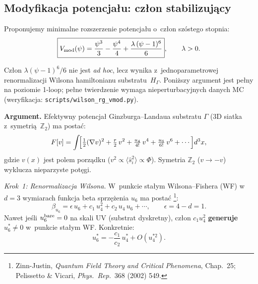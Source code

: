 \subsection{Modyfikacja potencjału: człon stabilizujący}%
\label{app:I-Vmod}

Proponujemy minimalne rozszerzenie potencjału o~człon szóstego stopnia:
\begin{equation}\label{eq:V-mod}
    \boxed{V_{\rm mod}(\psi)
    = \frac{\psi^3}{3} - \frac{\psi^4}{4}
    + \frac{\lambda\,(\psi-1)^6}{6}},
    \qquad \lambda > 0.
\end{equation}

\begin{proposition}%
\label{prop:V6-from-substrate}
Cz\l{}on $\lambda(\psi-1)^6/6$ nie jest \emph{ad hoc}, lecz wynika
z~jednoparametrowej renormalizacji Wilsona hamiltonianu
substratu~$H_\Gamma$.
Poni\.zszy argument jest pe\l{}ny na poziomie 1-loop;
pe\l{}ne twierdzenie wymaga nieperturbacyjnych danych MC
(weryfikacja: \texttt{scripts/wilson\_rg\_vmod.py}).

\medskip\noindent\textbf{Argument.}
Efektywny potencjał Ginzburga--Landaua substratu $\Gamma$
(3D siatka z~symetri\k{a}~$\mathbb{Z}_2$) ma postać:
\begin{equation}\label{eq:GL-substrate}
    F[v] = \int\!\Bigl[\tfrac{1}{2}(\nabla v)^2
    + \tfrac{r}{2}\,v^2 + \tfrac{u_4}{4!}\,v^4
    + \tfrac{u_6}{6!}\,v^6 + \cdots\Bigr]d^3x,
\end{equation}
gdzie $v(x)$ jest polem porz\k{a}dku ($v^2 \propto \langle\hat{s}_i^2\rangle
\propto \Phi$).
Symetria $\mathbb{Z}_2$ ($v \to -v$) wyklucza nieparzyste potęgi.

\medskip\noindent\emph{Krok~1: Renormalizacja Wilsona.}\;
W~punkcie stałym Wilsona--Fishera (WF) w~$d = 3$ wymiarach
funkcja beta sprzężenia $u_6$ ma postać%
\footnote{Zinn-Justin, \emph{Quantum Field Theory and Critical Phenomena},
Chap.~25; Pelissetto \& Vicari, \emph{Phys.\ Rep.}\ 368 (2002) 549.}:
\begin{equation}\label{eq:beta-u6}
    \beta_{u_6} = \epsilon\, u_6 + c_1\, u_4^2 + c_2\, u_4\, u_6 + \cdots,
    \qquad \epsilon = 4 - d = 1.
\end{equation}
Nawet je\'sli $u_6^{\rm bare} = 0$ na skali UV (substrat dyskretny),
człon $c_1 u_4^2$ \textbf{generuje} $u_6^* \neq 0$ w~punkcie stałym WF.
Konkretnie:
\begin{equation}\label{eq:u6-WF}
    u_6^* = -\frac{c_1}{c_2}\, u_4^* + O(u_4^{*2}).
\end{equation}


\end{proposition}
